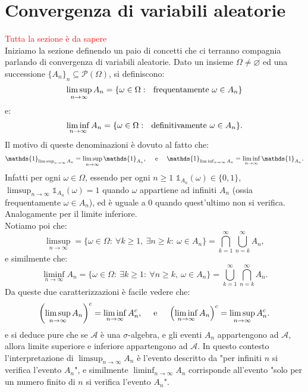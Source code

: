 \documentclass[11pt]{book}
\theoremstyle{Definizione}
\theoremstyle{TeoremaProposizioneLemmaCorollario}
\theoremstyle{OsservazioneNota}
\newcommand{\uno}[1]{\mathds{1}_{#1}}
\begin{document}
\section{Convergenza di variabili aleatorie}
\textcolor{red}{Tutta la sezione è da sapere}\\
Iniziamo la sezione definendo un paio di concetti che ci terranno compagnia parlando di convergenza di variabili aleatorie.
Dato un insieme $\Omega \neq \varnothing$ ed una successione $\{A_n\}_n \subseteq \mathcal{P}(\Omega)$, si definiscono:
$$
\limsup_{n\to \infty} A_n = \{\omega\in \Omega:\ \textup{ frequentamente }\omega\in A_n\}
$$
e:
$$
\liminf_{n \to \infty} A_n = \{\omega\in \Omega:\ \textup{ definitivamente }\omega\in A_n\}.
$$
Il motivo di queste denominazioni è dovuto al fatto che:
$$
\uno{\limsup_{n \to \infty} A_n} = \limsup_{n \to \infty} \uno{A_n},\quad \textup{ e }\quad \uno{\liminf_{n \to \infty} A_n} = \liminf_{n \to \infty} \uno{A_n}.
$$
Infatti per ogni $\omega\in \Omega$, essendo per ogni $n\geq 1$ $\uno{A_n}(\omega)\in \{0,1\}$, $\limsup_{n \to \infty} \uno{A_n}(\omega) = 1$ quando $\omega$ appartiene ad infiniti $A_n$ (ossia frequentamente $\omega\in A_n$), ed è uguale a $0$ quando quest'ultimo non si verifica. Analogamente per il limite inferiore.\\
Notiamo poi che:
$$
\limsup_{n \to \infty} = \{\omega\in \Omega:\ \forall k\geq 1,\ \exists n \geq k:\ \omega\in A_n\} = \bigcap_{k = 1}^\infty \bigcup_{n = k}^\infty A_n,
$$
e similmente che:
$$
\liminf_{n \to \infty} A_n = \{\omega\in \Omega:\ \exists k\geq 1:\ \forall n \geq k,\ \omega\in A_n\} = \bigcup_{k = 1}^\infty \bigcap_{n = k}^\infty A_n.
$$
Da queste due caratterizzazioni è facile vedere che:
$$
\left(\limsup_{n \to \infty} A_n\right)^c = \liminf_{n \to \infty} A_n^c,\quad \textup{ e }\quad \left(\liminf_{n \to \infty} A_n\right)^c = \limsup_{n \to \infty} A_n^c.
$$
e si deduce pure che se $\mathcal{A}$ è una $\sigma$-algebra, e gli eventi $A_n$ appartengono ad $\mathcal{A}$, allora limite superiore e inferiore appartengono ad $\mathcal{A}$. In questo contesto l'interpretazione di $\limsup_{n \to \infty} A_n$ è l'evento descritto da "per infiniti $n$ si verifica l'evento $A_n$", e similmente $\liminf_{n \to \infty} A_n$ corrisponde all'evento "solo per un numero finito di $n$ si verifica l'evento $A_n$".
\end{document}
